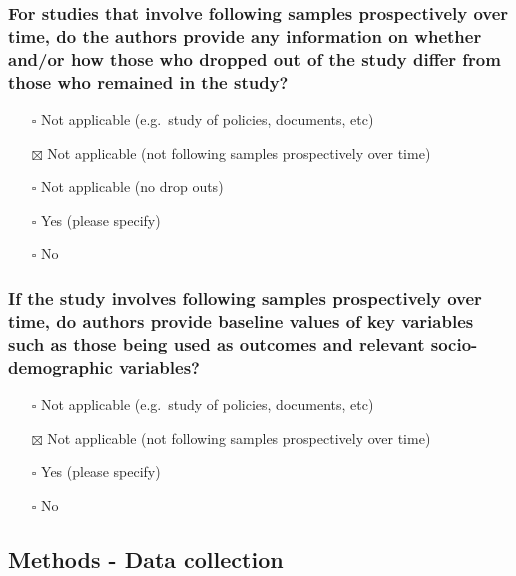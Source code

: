 \documentclass[
  doc, a4paper]{apa7}
\providecommand{\tightlist}{%
  \setlength{\itemsep}{0pt}\setlength{\parskip}{0pt}}
\begin{document}
\subsubsection{For studies that involve following samples prospectively over time, do the authors provide any information on whether and/or how those who dropped out of the study differ from those who remained in the study?}\label{for-studies-that-involve-following-samples-prospectively-over-time-do-the-authors-provide-any-information-on-whether-andor-how-those-who-dropped-out-of-the-study-differ-from-those-who-remained-in-the-study}

\begin{itemize}
\tightlist
\item[$\square$]
  Not applicable (e.g.~study of policies, documents, etc)
\item[$\boxtimes$]
  Not applicable (not following samples prospectively over time)
\item[$\square$]
  Not applicable (no drop outs)
\item[$\square$]
  Yes (please specify)
\item[$\square$]
  No
\end{itemize}

\subsubsection{If the study involves following samples prospectively over time, do authors provide baseline values of key variables such as those being used as outcomes and relevant socio-demographic variables?}\label{if-the-study-involves-following-samples-prospectively-over-time-do-authors-provide-baseline-values-of-key-variables-such-as-those-being-used-as-outcomes-and-relevant-socio-demographic-variables}

\begin{itemize}
\tightlist
\item[$\square$]
  Not applicable (e.g.~study of policies, documents, etc)
\item[$\boxtimes$]
  Not applicable (not following samples prospectively over time)
\item[$\square$]
  Yes (please specify)
\item[$\square$]
  No
\end{itemize}

\subsection{Methods - Data collection}\label{methods---data-collection}
\end{document}
